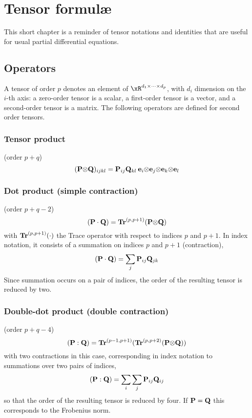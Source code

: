 
\chapter{Tensor formul\ae}

This short chapter is a reminder of tensor notations and identities that are useful for usual partial differential equations.

\section{Operators}

A tensor of order $p$ denotes an element of $\xR^{d_1\times\dots\times d_p}$, with $d_i$ dimension on the $i$-th axis: a zero-order tensor is a scalar, a first-order tensor is a vector, and a second-order tensor is a matrix.
The following operators are defined for second order tensors.


\subsection{Tensor product}
(order $p + q$)
\begin{equation}
({\mathbf P} {\otimes} {\mathbf Q})_{ijkl} = {\mathbf P}_{ij} {\mathbf Q}_{kl} \: {\mathbf e}_i {\otimes} {\mathbf e}_j {\otimes} {\mathbf e}_k {\otimes} {\mathbf e}_l
\end{equation}

\subsection{Dot product (simple contraction)}
(order $p + q -2$)
\begin{equation}
({\mathbf P} \cdot {\mathbf Q}) = {\mathbf{Tr}}^{(p,p+1)}({\mathbf P} {\otimes} {\mathbf Q})
\end{equation}
with ${\mathbf{Tr}}^{(p, p+1)}(\cdot)$ the Trace operator with respect to indices $p$ and $p+1$.
In index notation, it consists of a summation on indices $p$ and $p+1$ (contraction),
\begin{equation}
({\mathbf P} \cdot {\mathbf Q}) = \sum_j {\mathbf P}_{ij}{\mathbf Q}_{jk}
\end{equation}
Since summation occurs on a pair of indices, the order of the resulting tensor is reduced by two.

\subsection{Double-dot product (double contraction)}
(order $p + q -4$)
\begin{equation}
({\mathbf P} : {\mathbf Q}) = {\mathbf{Tr}}^{(p-1,p+1)}( {\mathbf{Tr}}^{(p,p+2)}({\mathbf P} {\otimes} {\mathbf Q}))
\end{equation}
with two contractions in this case, corresponding in index notation to summations over two  pairs of indices,
\begin{equation}
({\mathbf P} : {\mathbf Q}) = \sum_i\sum_j {\mathbf P}_{ij}{\mathbf Q}_{ij}
\end{equation}
so that the order of the resulting tensor is reduced by four.
If ${\mathbf P} = {\mathbf Q}$ this corresponds to the Frobenius norm.

